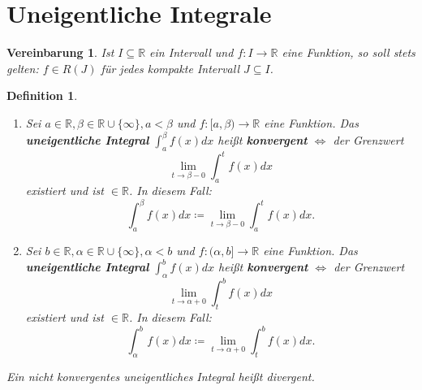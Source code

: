 \documentclass[14pt,titlepage,ngerman,a4paper,headsepline,DIV15,halfparskip*]{scrartcl}
\newcommand{\R}{\mathbb{R}}
\theoremstyle{named}
\theoremstyle{dotless}
\newtheorem*{definition}{Definition}
\newtheorem*{vereinbarung}{Vereinbarung}
\begin{document}
\newpage


\section{Uneigentliche Integrale}


\begin{vereinbarung}
	Ist $I \subseteq \R$ ein Intervall und $f \colon I \rightarrow \R$ eine Funktion, so soll stets gelten: $f \in R(J)$ für jedes kompakte Intervall $J \subseteq I$.	
\end{vereinbarung}

 
\begin{definition} ~\
	\begin{enumerate}
		\item Sei $a \in \R, \beta \in \R \cup \{ \infty \}, a < \beta$ und $f \colon [a, \beta) \rightarrow \R$ eine Funktion. Das \textbf{uneigentliche Integral} $\int_{a}^{\beta} f(x) dx$ hei{\ss}t \textbf{konvergent} $\iff$ der Grenzwert
			$$ \lim_{t \rightarrow \beta - 0} \int_{a}^{t} f(x) dx $$
			existiert und ist $\in \R$. In diesem Fall:
			$$ \int_{a}^{\beta} f(x) dx \coloneqq \lim_{t \rightarrow \beta - 0} \int_{a}^{t} f(x) dx. $$
		\item Sei $b \in \R, \alpha \in \R \cup \{ \infty \}, \alpha < b$ und $f \colon (\alpha, b] \rightarrow \R$ eine Funktion. Das \textbf{uneigentliche Integral} $\int_{\alpha}^{b} f(x) dx$ hei{\ss}t \textbf{konvergent} $\iff$ der Grenzwert
			$$ \lim_{t \rightarrow \alpha + 0} \int_{t}^{b} f(x) dx $$
			existiert und ist $\in \R$. In diesem Fall:
			$$ \int_{\alpha}^{b} f(x) dx \coloneqq \lim_{t \rightarrow \alpha + 0} \int_{t}^{b} f(x) dx. $$
	\end{enumerate}
	Ein nicht konvergentes uneigentliches Integral hei{\ss}t divergent.
\end{definition}
\end{document}
